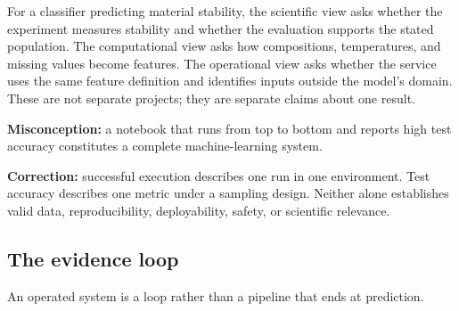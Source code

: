 For a classifier predicting material stability, the scientific view asks
whether the experiment measures stability and whether the evaluation supports
the stated population. The computational view asks how compositions,
temperatures, and missing values become features. The operational view asks
whether the service uses the same feature definition and identifies inputs
outside the model's domain. These are not separate projects; they are separate
claims about one result.

\begin{misconceptionbox}
\textbf{Misconception:} a notebook that runs from top to bottom and reports high
test accuracy constitutes a complete machine-learning system.

\textbf{Correction:} successful execution describes one run in one
environment. Test accuracy describes one metric under a sampling design.
Neither alone establishes valid data, reproducibility, deployability, safety,
or scientific relevance.
\end{misconceptionbox}

\subsection{The evidence loop}

An operated system is a loop rather than a pipeline that ends at prediction.

\begin{center}
\end{center}

